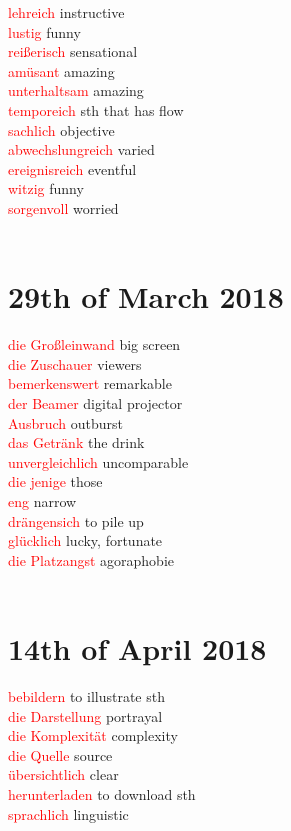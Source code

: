 \documentclass{article}
\begin{document}
\begin{multicols}{2}
	\textcolor{red}{lehreich} instructive \\
	\textcolor{red}{lustig} funny\\
	\textcolor{red}{reißerisch} sensational \\
	\textcolor{red}{amüsant} amazing\\
	\textcolor{red}{unterhaltsam} amazing \\ 
	\textcolor{red}{temporeich} sth that has flow \\
	\textcolor{red}{sachlich} objective\\
	\textcolor{red}{abwechslungreich} varied\\
	\textcolor{red}{ereignisreich} eventful\\ 
	\textcolor{red}{witzig} funny\\
	\textcolor{red}{sorgenvoll} worried\\\\
	
	\section*{29th of March 2018}
	\textcolor{red}{die Großleinwand} big screen\\
	\textcolor{red}{die Zuschauer} viewers\\
	\textcolor{red}{bemerkenswert} remarkable\\
	\textcolor{red}{der Beamer} digital projector\\
	\textcolor{red}{Ausbruch} outburst\\
	\textcolor{red}{das Getränk} the drink\\
	\textcolor{red}{unvergleichlich} uncomparable\\
	\textcolor{red}{die jenige} those\\
	\textcolor{red}{eng} narrow\\
	\textcolor{red}{drängensich} to pile up \\
	\textcolor{red}{glücklich} lucky, fortunate\\
	\textcolor{red}{die Platzangst} agoraphobie\\\\
	
	\section*{14th of April 2018}
	\textcolor{red}{bebildern} to illustrate sth\\
	\textcolor{red}{die Darstellung} portrayal\\
	\textcolor{red}{die Komplexität} complexity\\
	\textcolor{red}{die Quelle} source\\
	\textcolor{red}{übersichtlich} clear\\
	\textcolor{red}{herunterladen} to download sth\\
	\textcolor{red}{sprachlich} linguistic\\\\
	

\end{multicols}
\end{document}
